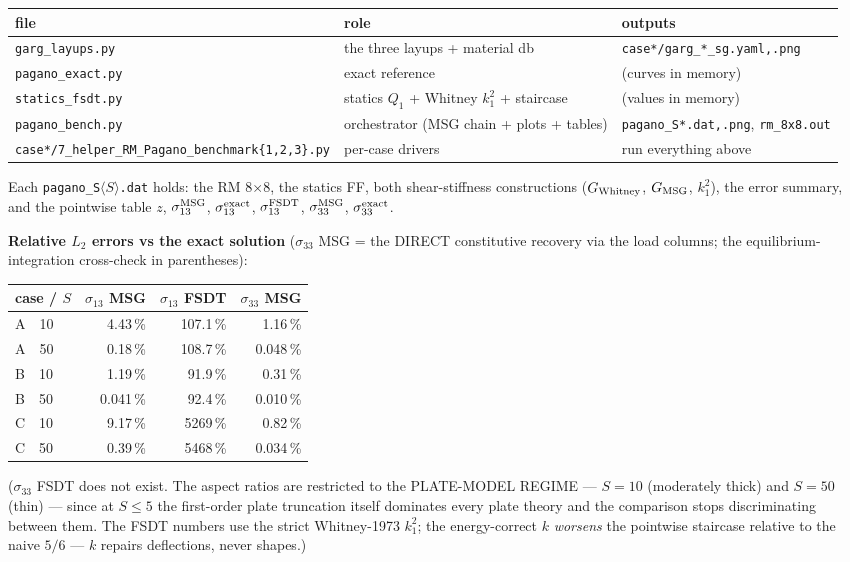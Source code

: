 \documentclass[11pt]{article}
\newcommand{\code}[1]{\texttt{#1}}
\begin{document}
\begin{center}\small
\begin{tabular}{lll}
\toprule
file & role & outputs \\
\midrule
\code{garg\_layups.py} & the three layups + material db & \code{case*/garg\_*\_sg.yaml,.png}\\
\code{pagano\_exact.py} & exact reference & (curves in memory)\\
\code{statics\_fsdt.py} & statics $Q_1$ + Whitney $k_1^2$ + staircase & (values in memory)\\
\code{pagano\_bench.py} & orchestrator (MSG chain + plots + tables) & \code{pagano\_S*.dat,.png}, \code{rm\_8x8.out}\\
\code{case*/7\_helper\_RM\_Pagano\_benchmark\{1,2,3\}.py} & per-case drivers & run everything above\\
\bottomrule
\end{tabular}
\end{center}

Each \code{pagano\_S$\langle S\rangle$.dat} holds: the RM 8$\times$8, the statics FF,
both shear-stiffness constructions ($G_{\rm Whitney}$, $G_{\rm MSG}$, $k_1^2$), the
error summary, and the pointwise table $z$, $\sigma_{13}^{\rm MSG}$,
$\sigma_{13}^{\rm exact}$, $\sigma_{13}^{\rm FSDT}$, $\sigma_{33}^{\rm MSG}$,
$\sigma_{33}^{\rm exact}$.

\textbf{Relative $L_2$ errors vs the exact solution} ($\sigma_{33}$ MSG = the DIRECT
constitutive recovery via the load columns; the equilibrium-integration cross-check in
parentheses):
\begin{center}\small
\begin{tabular}{lrrr}
\toprule
case / $S$ & $\sigma_{13}$ MSG & $\sigma_{13}$ FSDT & $\sigma_{33}$ MSG \\
\midrule
A\ \ 10  &  4.43\,\% & 107.1\,\% & 1.16\,\% \\
A\ \ 50  &  0.18\,\% & 108.7\,\% & 0.048\,\% \\
B\ \ 10  &  1.19\,\% &  91.9\,\% & 0.31\,\% \\
B\ \ 50  &  0.041\,\% &  92.4\,\% & 0.010\,\% \\
C\ \ 10  &  9.17\,\% & 5269\,\% & 0.82\,\% \\
C\ \ 50  &  0.39\,\% & 5468\,\% & 0.034\,\% \\
\bottomrule
\end{tabular}
\end{center}
($\sigma_{33}$ FSDT does not exist.  The aspect ratios are restricted to the PLATE-MODEL REGIME
--- $S = 10$ (moderately thick) and $S = 50$ (thin) --- since at $S \le 5$ the
first-order plate truncation itself dominates every plate theory and the comparison
stops discriminating between them.  The FSDT numbers use the strict Whitney-1973
$k_1^2$; the energy-correct $k$ \emph{worsens} the pointwise staircase relative to the
naive $5/6$ --- $k$ repairs deflections, never shapes.)
\end{document}
